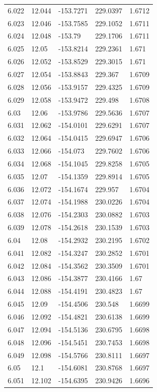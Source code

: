 \begin{tabular}{lllll}
6.022 & 12.044 & -153.7271 & 229.0397 & 1.6712 \\
6.023 & 12.046 & -153.7585 & 229.1052 & 1.6711 \\
6.024 & 12.048 & -153.79 & 229.1706 & 1.6711 \\
6.025 & 12.05 & -153.8214 & 229.2361 & 1.671 \\
6.026 & 12.052 & -153.8529 & 229.3015 & 1.671 \\
6.027 & 12.054 & -153.8843 & 229.367 & 1.6709 \\
6.028 & 12.056 & -153.9157 & 229.4325 & 1.6709 \\
6.029 & 12.058 & -153.9472 & 229.498 & 1.6708 \\
6.03 & 12.06 & -153.9786 & 229.5636 & 1.6707 \\
6.031 & 12.062 & -154.0101 & 229.6291 & 1.6707 \\
6.032 & 12.064 & -154.0415 & 229.6947 & 1.6706 \\
6.033 & 12.066 & -154.073 & 229.7602 & 1.6706 \\
6.034 & 12.068 & -154.1045 & 229.8258 & 1.6705 \\
6.035 & 12.07 & -154.1359 & 229.8914 & 1.6705 \\
6.036 & 12.072 & -154.1674 & 229.957 & 1.6704 \\
6.037 & 12.074 & -154.1988 & 230.0226 & 1.6704 \\
6.038 & 12.076 & -154.2303 & 230.0882 & 1.6703 \\
6.039 & 12.078 & -154.2618 & 230.1539 & 1.6703 \\
6.04 & 12.08 & -154.2932 & 230.2195 & 1.6702 \\
6.041 & 12.082 & -154.3247 & 230.2852 & 1.6701 \\
6.042 & 12.084 & -154.3562 & 230.3509 & 1.6701 \\
6.043 & 12.086 & -154.3877 & 230.4166 & 1.67 \\
6.044 & 12.088 & -154.4191 & 230.4823 & 1.67 \\
6.045 & 12.09 & -154.4506 & 230.548 & 1.6699 \\
6.046 & 12.092 & -154.4821 & 230.6138 & 1.6699 \\
6.047 & 12.094 & -154.5136 & 230.6795 & 1.6698 \\
6.048 & 12.096 & -154.5451 & 230.7453 & 1.6698 \\
6.049 & 12.098 & -154.5766 & 230.8111 & 1.6697 \\
6.05 & 12.1 & -154.6081 & 230.8768 & 1.6697 \\
6.051 & 12.102 & -154.6395 & 230.9426 & 1.6696 \\

\end{tabular}
